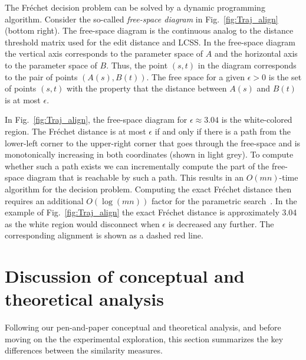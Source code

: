 \documentclass{interact}
\begin{document}
The Fr\'echet decision problem can be solved by a dynamic programming algorithm. Consider the so-called \emph{free-space diagram} in Fig.~\ref{fig:Traj_align} (bottom right). The free-space diagram is the continuous analog to the distance threshold matrix used for the edit distance and LCSS. In the free-space diagram the vertical axis corresponds to the parameter space of $A$ and the horizontal axis to the parameter space of $B$. Thus, the point $(s,t)$ in the diagram corresponds to the pair of points $(A(s), B(t))$. The free space for a given $\epsilon > 0$ is the set of points $(s,t)$ with the property that the distance between $A(s)$ and $B(t)$ is at most $\epsilon$.

In Fig.~\ref{fig:Traj_align}, the free-space diagram for $\epsilon \approx 3.04$ is the white-colored region. The Fr\'echet distance is at most $\epsilon$ if and only if there is a path from the lower-left corner to the upper-right corner that goes through the free-space and is monotonically increasing in both coordinates (shown in light grey). To compute whether such a path exists we can incrementally compute the part of the free-space diagram that is reachable by such a path. This results in an $O(mn)$-time algorithm for the decision problem. Computing the exact Fr\'echet distance then requires an additional $O(\log (mn))$ factor for the parametric search~\citep{ag-cfd-95}. In the example of Fig.~\ref{fig:Traj_align} the exact Fr\'echet distance is approximately 3.04 as the white region would disconnect when $\epsilon$ is decreased any further. The corresponding alignment is shown as a dashed red line.

\section{Discussion of conceptual and theoretical analysis}
Following our pen-and-paper conceptual and theoretical analysis, and before moving on the the experimental exploration, this section summarizes the key differences between the similarity measures.

\end{document}
